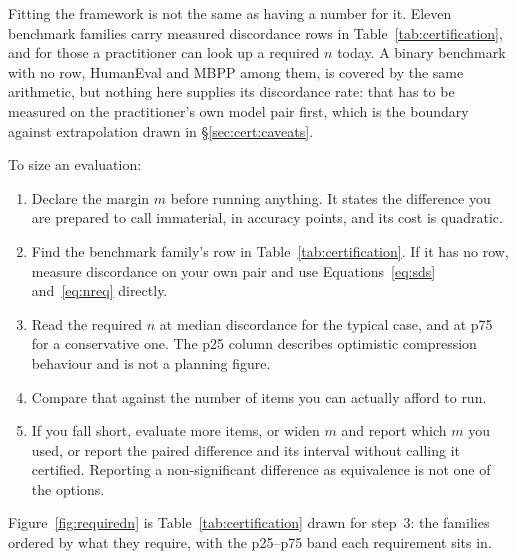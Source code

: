 Fitting the framework is not the same as having a number for it. Eleven
benchmark families carry measured discordance rows in
Table~\ref{tab:certification}, and for those a practitioner can look up a
required $n$ today. A binary benchmark with no row, HumanEval and MBPP among
them, is covered by the same arithmetic, but nothing here supplies its
discordance rate: that has to be measured on the practitioner's own model pair
first, which is the boundary against extrapolation drawn in
\S\ref{sec:cert:caveats}.

To size an evaluation:
\begin{enumerate}
\item Declare the margin $m$ before running anything. It states the difference
you are prepared to call immaterial, in accuracy points, and its cost is
quadratic.
\item Find the benchmark family's row in Table~\ref{tab:certification}. If it
has no row, measure discordance on your own pair and use
Equations~\eqref{eq:sds} and~\eqref{eq:nreq} directly.
\item Read the required $n$ at median discordance for the typical case, and at
p75 for a conservative one. The p25 column describes optimistic compression
behaviour and is not a planning figure.
\item Compare that against the number of items you can actually afford to run.
\item If you fall short, evaluate more items, or widen $m$ and report which $m$
you used, or report the paired difference and its interval without calling it
certified. Reporting a non-significant difference as equivalence is not one of
the options.
\end{enumerate}

Figure~\ref{fig:requiredn} is Table~\ref{tab:certification} drawn for step~3:
the families ordered by what they require, with the p25--p75 band each
requirement sits in.



